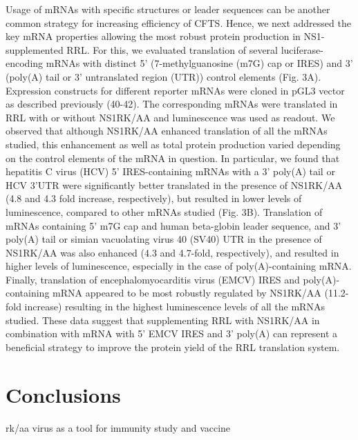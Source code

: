 Usage of mRNAs with specific structures or leader sequences can be another common strategy for increasing efficiency of CFTS. Hence, we next addressed the key mRNA properties allowing the most robust protein production in NS1-supplemented RRL. For this, we evaluated translation of several luciferase-encoding mRNAs with distinct 5’ (7-methylguanosine (m7G) cap or IRES) and 3’ (poly(A) tail or 3’ untranslated region (UTR)) control elements (Fig. 3A). Expression constructs for different reporter mRNAs were cloned in pGL3 vector as described previously (40-42). The corresponding mRNAs were translated in RRL with or without NS1RK/AA and luminescence was used as readout. We observed that although NS1RK/AA enhanced translation of all the mRNAs studied, this enhancement as well as total protein production varied depending on the control elements of the mRNA in question. In particular, we found that hepatitis C virus (HCV) 5’ IRES-containing mRNAs with a 3’ poly(A) tail or HCV 3’UTR were significantly better translated in the presence of NS1RK/AA (4.8 and 4.3 fold increase, respectively), but resulted in lower levels of luminescence, compared to other mRNAs studied (Fig. 3B). Translation of mRNAs containing 5’ m7G cap and human beta-globin leader sequence, and 3’ poly(A) tail or simian vacuolating virus 40 (SV40) UTR in the presence of NS1RK/AA was also enhanced (4.3 and 4.7-fold, respectively), and resulted in higher levels of luminescence, especially in the case of poly(A)-containing mRNA. Finally, translation of encephalomyocarditis virus (EMCV) IRES and poly(A)-containing mRNA appeared to be most robustly regulated by NS1RK/AA (11.2-fold increase) resulting in the highest luminescence levels of all the mRNAs studied. These data suggest that supplementing RRL with NS1RK/AA in combination with mRNA with 5’ EMCV IRES and 3’ poly(A) can represent a beneficial strategy to improve the protein yield of the RRL translation system. 
	
\newpage
\section{Conclusions}

	rk/aa virus as a tool for immunity study and vaccine
